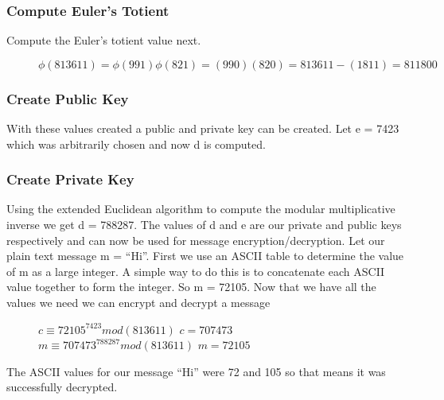 \documentclass[conference]{IEEEtran}
\begin{document}
\subsubsection{Compute Euler's Totient}
Compute the Euler's totient value next.
\begin{figure}[h]
	\begin{center}
$\phi \left(813611\right)=\phi \left(991\right)\phi \left(821\right)=\left(990\right)\left(820\right)=813611-\left(1811\right) = 811800$
\end{center}
\end{figure}
\subsubsection{Create Public Key}
With these values created a public and private key can be created. Let e = 7423 which was arbitrarily chosen and now d is computed.
\subsubsection{Create Private Key}
Using the extended Euclidean algorithm to compute the modular multiplicative inverse we get d = 788287. The values of d and e are our private and public keys respectively and can now be used for message encryption/decryption. \newline \indent
Let our plain text message m = ``Hi''. First we use an ASCII table to determine the value of m as a large integer. A simple way to do this is to concatenate each ASCII value together to form the integer. So m = 72105. Now that we have all the values we need we can encrypt and decrypt a message
\begin{figure}[h]
	\begin{center}
		$c \equiv {72105}^{7423} mod (813611)$ \newline
		$c = 707473$ \newline
		$m \equiv {707473}^{788287} mod (813611)$ \newline
		$m = 72105$ \newline
	\end{center}
\end{figure}

The ASCII values for our message ``Hi'' were 72 and 105 so that means it was successfully decrypted.
\end{document}
